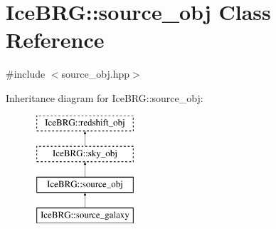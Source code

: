 \hypertarget{classIceBRG_1_1source__obj}{}\section{Ice\+B\+R\+G\+:\+:source\+\_\+obj Class Reference}
\label{classIceBRG_1_1source__obj}


{\ttfamily \#include $<$source\+\_\+obj.\+hpp$>$}

Inheritance diagram for Ice\+B\+R\+G\+:\+:source\+\_\+obj\+:\begin{figure}[H]
\begin{center}
\leavevmode
\includegraphics[height=4.000000cm]{classIceBRG_1_1source__obj}
\end{center}
\end{figure}
